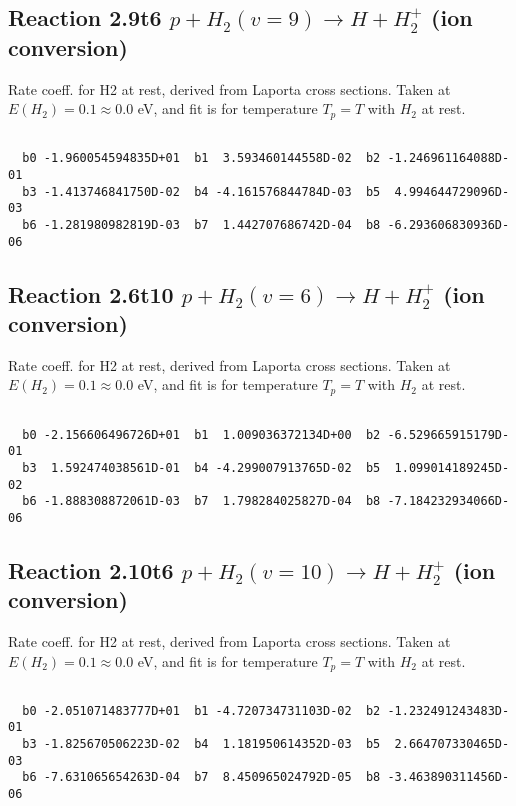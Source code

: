 \documentclass[12pt,dvipdfmx]{article}
\begin{document}
\newpage
\subsection{
Reaction 2.9t6
$ p + H_2(v=9) \rightarrow H + H_2^+$ (ion conversion)
}
Rate coeff. for H2 at rest, derived from Laporta cross sections.
Taken at $E(H_2) = 0.1 \approx 0.0$ eV,  and fit is for temperature $T_p=T$ with $H_2$ at rest.

\begin{small}\begin{verbatim}

  b0 -1.960054594835D+01  b1  3.593460144558D-02  b2 -1.246961164088D-01
  b3 -1.413746841750D-02  b4 -4.161576844784D-03  b5  4.994644729096D-03
  b6 -1.281980982819D-03  b7  1.442707686742D-04  b8 -6.293606830936D-06

\end{verbatim}\end{small}

\newpage
\subsection{
Reaction 2.6t10
$ p + H_2(v=6) \rightarrow H + H_2^+$ (ion conversion)
}
Rate coeff. for H2 at rest, derived from Laporta cross sections.
Taken at $E(H_2) = 0.1 \approx 0.0$ eV,  and fit is for temperature $T_p=T$ with $H_2$ at rest.

\begin{small}\begin{verbatim}

  b0 -2.156606496726D+01  b1  1.009036372134D+00  b2 -6.529665915179D-01
  b3  1.592474038561D-01  b4 -4.299007913765D-02  b5  1.099014189245D-02
  b6 -1.888308872061D-03  b7  1.798284025827D-04  b8 -7.184232934066D-06

\end{verbatim}\end{small}

\newpage
\subsection{
Reaction 2.10t6
$ p + H_2(v=10) \rightarrow H + H_2^+$ (ion conversion)
}
Rate coeff. for H2 at rest, derived from Laporta cross sections.
Taken at $E(H_2) = 0.1 \approx 0.0$ eV,  and fit is for temperature $T_p=T$ with $H_2$ at rest.

\begin{small}\begin{verbatim}

  b0 -2.051071483777D+01  b1 -4.720734731103D-02  b2 -1.232491243483D-01
  b3 -1.825670506223D-02  b4  1.181950614352D-03  b5  2.664707330465D-03
  b6 -7.631065654263D-04  b7  8.450965024792D-05  b8 -3.463890311456D-06

\end{verbatim}\end{small}
\end{document}

